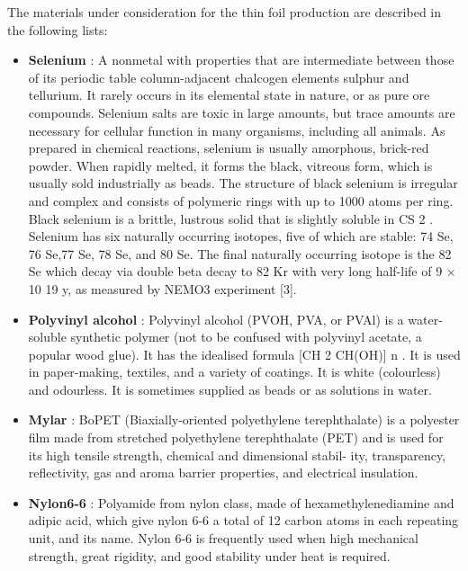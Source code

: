 \documentclass[main.tex]{subfiles}
\begin{document}
\NI The materials under consideration for the thin foil production are described in the following lists:


\begin{itemize}


\item \textbf{Selenium} : A nonmetal with properties that are intermediate between those of its periodic table column-adjacent chalcogen elements sulphur and tellurium. It rarely occurs in its elemental state in nature, or as pure ore compounds. Selenium salts are toxic in large amounts, but trace amounts are necessary for cellular function in many organisms, including all animals. As prepared in chemical reactions, selenium is usually amorphous, brick-red powder. When rapidly melted, it forms the black, vitreous form, which is usually sold industrially as beads. The structure of black selenium is irregular and complex and consists of polymeric rings with up to 1000 atoms per ring. Black selenium is a brittle, lustrous solid that is slightly soluble in CS 2 . Selenium has six naturally occurring isotopes, five of which are stable: 74 Se, 76 Se,77 Se, 78 Se, and 80 Se. The final naturally occurring isotope is the 82 Se which decay via double beta decay to 82 Kr with very long half-life of 9 $\times$ 10 19 y, as measured by NEMO3 experiment [3].


\item \textbf{Polyvinyl alcohol} : Polyvinyl alcohol (PVOH, PVA, or PVAl) is a water-soluble synthetic polymer (not to be confused with polyvinyl acetate, a popular wood glue). It has the idealised formula [CH 2 CH(OH)] n . It is used in paper-making, textiles, and a variety of coatings. It is white (colourless) and odourless. It is sometimes supplied as beads or as solutions in water.


\item \textbf{Mylar} : BoPET (Biaxially-oriented polyethylene terephthalate) is a polyester film made from stretched polyethylene terephthalate (PET) and is used for its high tensile strength, chemical and dimensional stabil- ity, transparency, reflectivity, gas and aroma barrier properties, and electrical insulation.


\item \textbf{Nylon6-6} : Polyamide from nylon class, made of hexamethylenediamine and adipic acid, which give nylon 6-6 a total of 12 carbon atoms in each repeating unit, and its name. Nylon 6-6 is frequently used when high mechanical strength, great rigidity, and good stability under heat is required.


\end{itemize}
\end{document}

